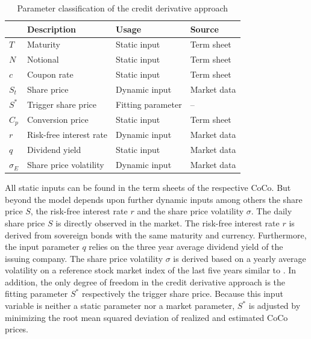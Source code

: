 \begin{table}[H]
 \setlength{\extrarowheight}{2.5pt}
 \centering
 \begin{tabular}{llll}
  \toprule
    & \textbf{Description} & \textbf{Usage} & \textbf{Source} \\
  \midrule
   $T$ & Maturity & Static input & Term sheet \\
   $N$ & Notional & Static input & Term sheet \\   
   $c$ & Coupon rate & Static input & Term sheet \\
   $S_t$ & Share price & Dynamic input & Market data \\
   $S^*$ & Trigger share price & Fitting parameter & -- \\
   $C_p$ & Conversion price & Static input & Term sheet \\
   $r$ & Risk-free interest rate & Dynamic input & Market data \\
   $q$ & Dividend yield & Static input & Market data\\
   $\sigma_E$& Share price volatility & Dynamic input & Market data \\
  \bottomrule
 \end{tabular}
 \caption[Parameter classification of the credit derivative approach]{Parameter classification of the credit derivative approach \citep{wilkens2014contingent}}
 \label{creditparameters}
\end{table}

All static inputs can be found in the term sheets of the respective CoCo. But beyond the model depends upon further dynamic inputs among others the share price $S$, the risk-free interest rate $r$ and the share price volatility $\sigma$. The daily share price $S$ is directly observed in the market. The risk-free interest rate $r$ is derived from sovereign bonds with the same maturity and currency. Furthermore, the input parameter $q$ relies on the three year average dividend yield of the issuing company. The share price volatility $\sigma$ is derived based on a yearly average volatility on a reference stock market index of the last five years similar to \citet{alvemar2012modelling}. In addition, the only degree of freedom in the credit derivative approach is the fitting parameter $S^*$ respectively the trigger share price. Because this input variable is neither a static parameter nor a market parameter, $S^*$ is adjusted by minimizing the root mean squared deviation of realized and estimated CoCo prices. \citep{erismann2011analytical}

